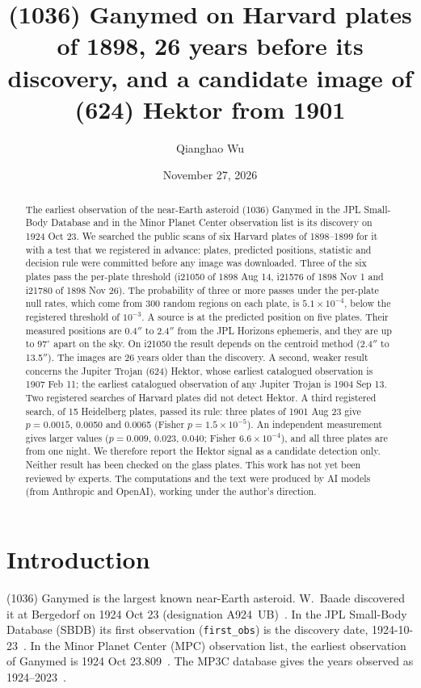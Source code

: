 \documentclass[11pt]{article}
\title{(1036) Ganymed on Harvard plates of 1898, 26 years before its discovery, and a candidate image of (624) Hektor from 1901}
\author{Qianghao Wu}
\date{November 27, 2026}
\newcommand{\as}{$''$}
\begin{document}
\sloppy
\maketitle

\begin{abstract}
The earliest observation of the near-Earth asteroid (1036) Ganymed in the JPL Small-Body Database and in the Minor Planet Center observation list is its discovery on 1924 Oct 23. We searched the public scans of six Harvard plates of 1898--1899 for it with a test that we registered in advance: plates, predicted positions, statistic and decision rule were committed before any image was downloaded. Three of the six plates pass the per-plate threshold (i21050 of 1898 Aug 14, i21576 of 1898 Nov 1 and i21780 of 1898 Nov 26). The probability of three or more passes under the per-plate null rates, which come from 300 random regions on each plate, is $5.1\times10^{-4}$, below the registered threshold of $10^{-3}$. A source is at the predicted position on five plates. Their measured positions are 0.4\as{} to 2.4\as{} from the JPL Horizons ephemeris, and they are up to $97^\circ$ apart on the sky. On i21050 the result depends on the centroid method (2.4\as{} to 13.5\as{}). The images are 26 years older than the discovery. A second, weaker result concerns the Jupiter Trojan (624) Hektor, whose earliest catalogued observation is 1907 Feb 11; the earliest catalogued observation of any Jupiter Trojan is 1904 Sep 13. Two registered searches of Harvard plates did not detect Hektor. A third registered search, of 15 Heidelberg plates, passed its rule: three plates of 1901 Aug 23 give $p=0.0015$, 0.0050 and 0.0065 (Fisher $p=1.5\times10^{-5}$). An independent measurement gives larger values ($p=0.009$, 0.023, 0.040; Fisher $6.6\times10^{-4}$), and all three plates are from one night. We therefore report the Hektor signal as a candidate detection only. Neither result has been checked on the glass plates.
This work has not yet been reviewed by experts. The computations and the text were produced by AI models (from Anthropic and OpenAI), working under the author's direction.
\end{abstract}

\section{Introduction}
(1036) Ganymed is the largest known near-Earth asteroid. W.~Baade discovered it at Bergedorf on 1924 Oct 23 (designation A924~UB)~\cite{sbdb}. In the JPL Small-Body Database (SBDB) its first observation (\texttt{first\_obs}) is the discovery date, 1924-10-23~\cite{sbdb}. In the Minor Planet Center (MPC) observation list, the earliest observation of Ganymed is 1924 Oct 23.809~\cite{mpcobs}. The MP3C database gives the years observed as 1924--2023~\cite{mp3c}.
\end{document}
